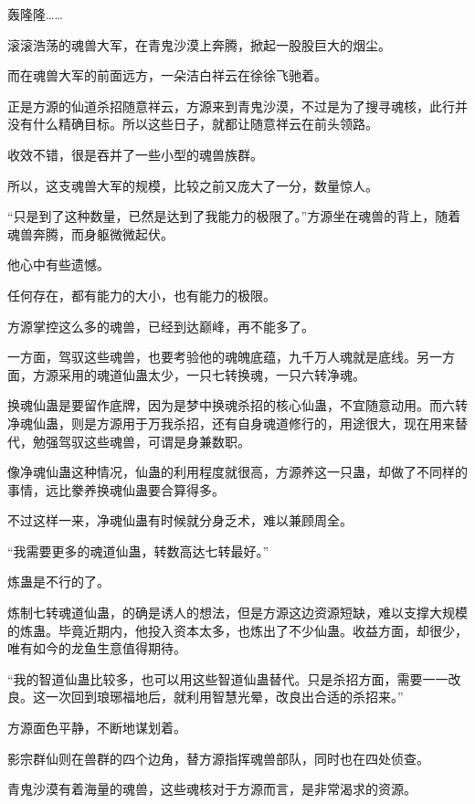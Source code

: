 
\begin{this_body}

轰隆隆……

滚滚浩荡的魂兽大军，在青鬼沙漠上奔腾，掀起一股股巨大的烟尘。

而在魂兽大军的前面远方，一朵洁白祥云在徐徐飞驰着。

正是方源的仙道杀招随意祥云，方源来到青鬼沙漠，不过是为了搜寻魂核，此行并没有什么精确目标。所以这些日子，就都让随意祥云在前头领路。

收效不错，很是吞并了一些小型的魂兽族群。

所以，这支魂兽大军的规模，比较之前又庞大了一分，数量惊人。

“只是到了这种数量，已然是达到了我能力的极限了。”方源坐在魂兽的背上，随着魂兽奔腾，而身躯微微起伏。

他心中有些遗憾。

任何存在，都有能力的大小，也有能力的极限。

方源掌控这么多的魂兽，已经到达巅峰，再不能多了。

一方面，驾驭这些魂兽，也要考验他的魂魄底蕴，九千万人魂就是底线。另一方面，方源采用的魂道仙蛊太少，一只七转换魂，一只六转净魂。

换魂仙蛊是要留作底牌，因为是梦中换魂杀招的核心仙蛊，不宜随意动用。而六转净魂仙蛊，则是方源用于万我杀招，还有自身魂道修行的，用途很大，现在用来替代，勉强驾驭这些魂兽，可谓是身兼数职。

像净魂仙蛊这种情况，仙蛊的利用程度就很高，方源养这一只蛊，却做了不同样的事情，远比豢养换魂仙蛊要合算得多。

不过这样一来，净魂仙蛊有时候就分身乏术，难以兼顾周全。

“我需要更多的魂道仙蛊，转数高达七转最好。”

炼蛊是不行的了。

炼制七转魂道仙蛊，的确是诱人的想法，但是方源这边资源短缺，难以支撑大规模的炼蛊。毕竟近期内，他投入资本太多，也炼出了不少仙蛊。收益方面，却很少，唯有如今的龙鱼生意值得期待。

“我的智道仙蛊比较多，也可以用这些智道仙蛊替代。只是杀招方面，需要一一改良。这一次回到琅琊福地后，就利用智慧光晕，改良出合适的杀招来。”

方源面色平静，不断地谋划着。

影宗群仙则在兽群的四个边角，替方源指挥魂兽部队，同时也在四处侦查。

青鬼沙漠有着海量的魂兽，这些魂核对于方源而言，是非常渴求的资源。


\end{this_body}
